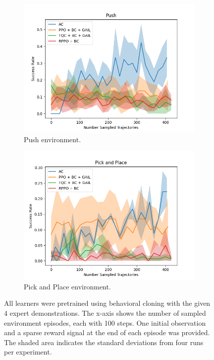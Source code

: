 \begin{figure}[htbp]
\begin{subfigure}[b]{0.45\textwidth}
    \includegraphics[width=\textwidth]{images/4_400/Push.png}
    \caption{Push environment.}
    \label{fig:plot3}
  \end{subfigure}
  \hfill
  \begin{subfigure}[b]{0.45\textwidth}
    \includegraphics[width=\textwidth]{images/4_400/Pick and Place.png}
    \caption{Pick and Place environment.}
    \label{fig:plot4}
  \end{subfigure}
  \caption{All learners were pretrained using behavioral cloning with the given 4 expert demonstrations. 
  The x-axis shows the number of sampled environment episodes, each with 100 steps.  One initial observation and a sparse reward signal at the end of each episode was provided. 
  The shaded area indicates the standard deviations from four runs per experiment.}
  \label{fig:4}
\end{figure}

